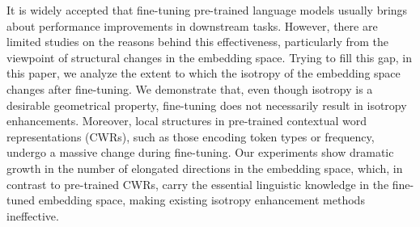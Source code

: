 It is widely accepted that fine-tuning pre-trained language models usually brings about performance improvements in downstream tasks. However, there are limited studies on the reasons behind this effectiveness, particularly from the viewpoint of structural changes in the embedding space. Trying to fill this gap, in this paper, we analyze the extent to which the isotropy of the embedding space changes after fine-tuning. We demonstrate that, even though isotropy is a desirable geometrical property, fine-tuning does not necessarily result in isotropy enhancements. Moreover, local structures in pre-trained contextual word representations (CWRs), such as those encoding token types or frequency, undergo a massive change during fine-tuning. Our experiments show dramatic growth in the number of elongated directions in the embedding space, which, in contrast to pre-trained CWRs, carry the essential linguistic knowledge in the fine-tuned embedding space, making existing isotropy enhancement methods ineffective.
